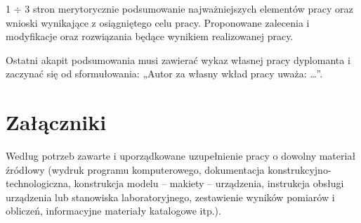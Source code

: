 \documentclass[12pt,twoside]{article}
\begin{document}
1 $\div$ 3 stron merytorycznie podsumowanie najważniejszych elementów pracy oraz wnioski wynikające z osiągniętego celu pracy. Proponowane zalecenia i modyfikacje oraz rozwiązania będące wynikiem realizowanej pracy.

Ostatni akapit podsumowania musi zawierać wykaz własnej pracy dyplomanta i zaczynać się od sformułowania: „Autor za własny wkład pracy uważa: \ldots”.

\clearpage

\section*{Załączniki}

Według potrzeb zawarte i uporządkowane uzupełnienie pracy o dowolny materiał źródłowy (wydruk programu komputerowego, dokumentacja kons\-truk\-cyj\-no-\-tech\-no\-lo\-gicz\-na, konstrukcja modelu -- makiety -- urządzenia, instrukcja obsługi urządzenia lub stanowiska laboratoryjnego, zestawienie wyników pomiarów i obliczeń, informacyjne materiały katalogowe itp.).


\clearpage

\end{document}
